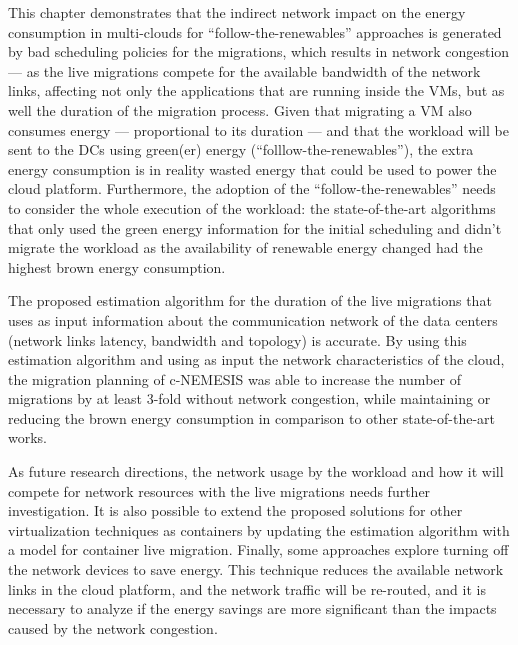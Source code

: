 This chapter demonstrates that the indirect network impact on the energy consumption in multi-clouds for ``follow-the-renewables'' approaches is generated by bad scheduling policies for the migrations, which results in network congestion --- as the live migrations compete for the available bandwidth of the network links, affecting not only the applications that are running inside the VMs, but as well the duration of the migration process. Given that migrating a VM also consumes energy --- proportional to its duration --- and that the workload will be sent to the DCs using green(er) energy (``folllow-the-renewables''), the extra energy consumption is in reality wasted energy that could be used to power the cloud platform. Furthermore, the adoption of the ``follow-the-renewables'' needs to consider the whole execution of the workload:  the state-of-the-art algorithms that only used the green energy information for the initial scheduling and didn't migrate the workload as the availability of renewable energy changed had the highest brown energy consumption. 

The proposed estimation algorithm for the duration of the live migrations that uses as input information about the communication network of the data centers (network links latency, bandwidth and topology) is accurate. By using this estimation algorithm and using as input the network characteristics of the cloud, the migration planning of c-NEMESIS was able to increase the number of migrations by at least 3-fold without network congestion, while maintaining or reducing the brown energy consumption in comparison to other state-of-the-art works.

As future research directions, the network usage by the workload and how it will compete for network resources with the live migrations needs further investigation. It is also possible to extend the proposed solutions for other virtualization techniques as containers by updating the estimation algorithm with a model for container live migration. Finally, some approaches explore turning off the network devices to save energy. This technique reduces the available network links in the cloud platform, and the network traffic will be re-routed, and it is necessary to analyze if the energy savings are more significant than the impacts caused by the network congestion.